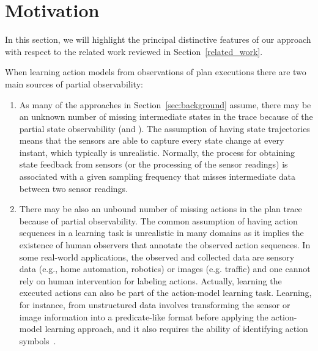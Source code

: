 
\section{Motivation}
\label{sec:motivation}

In this section, we will highlight the principal distinctive features of our approach \FAMA with respect to the related work reviewed in Section~\ref{related_work}.

\vspace{0.1cm}

When learning action models from observations of plan executions there are two main sources of partial observability:
\begin{enumerate}
\item As many of the approaches in Section~\ref{sec:background} assume, there may be an unknown number of missing intermediate states in the trace because of the partial state observability (\PO and \NO). The assumption of having \FO state trajectories means that the sensors are able to capture every state change at every instant, which typically is unrealistic. Normally, the process for obtaining state feedback from sensors (or the processing of the sensor readings) is associated with a given sampling frequency that misses intermediate data between two sensor readings.

\item There may be also an unbound number of missing actions in the plan trace because of partial observability. The common assumption of having \FO action sequences in a learning task is unrealistic in many domains as it implies the existence of human observers that annotate the observed action sequences. In some real-world applications, the observed and collected data are sensory data (e.g., home automation, robotics) or images (e.g. traffic) and one cannot rely on human intervention for labeling actions. Actually, learning the executed actions can also be part of the action-model learning task. Learning, for instance, from unstructured data involves transforming the sensor or image information into a predicate-like format before applying the action-model learning approach, and it also requires the ability of identifying action symbols~\cite{AsaiF18}.
\end{enumerate}


